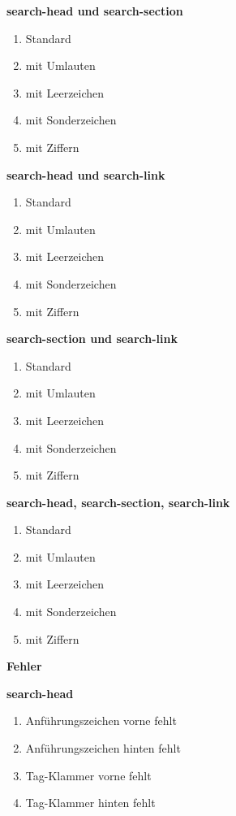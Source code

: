 \pagebreak

\textbf{search-head und search-section} 
\begin{enumerate}
 	\item Standard
  	\item mit Umlauten
	\item mit Leerzeichen
	\item mit Sonderzeichen
	\item mit Ziffern
\end{enumerate}

\textbf{search-head und search-link} 
\begin{enumerate}
\item Standard
\item mit Umlauten
\item mit Leerzeichen
\item mit Sonderzeichen
\item mit Ziffern
\end{enumerate}

\textbf{search-section und search-link} 
\begin{enumerate}
\item Standard
\item mit Umlauten
\item mit Leerzeichen
\item mit Sonderzeichen
\item mit Ziffern
\end{enumerate}

\textbf{search-head, search-section, search-link}
\begin{enumerate}
\item Standard
\item mit Umlauten
\item mit Leerzeichen
\item mit Sonderzeichen
\item mit Ziffern
\end{enumerate}

\pagebreak

\textbf{{\large Fehler}}

\textbf{search-head}
\begin{enumerate}
\item Anführungszeichen vorne fehlt
\item Anführungszeichen hinten fehlt
\item Tag-Klammer vorne fehlt
\item Tag-Klammer hinten fehlt
\end{enumerate}

